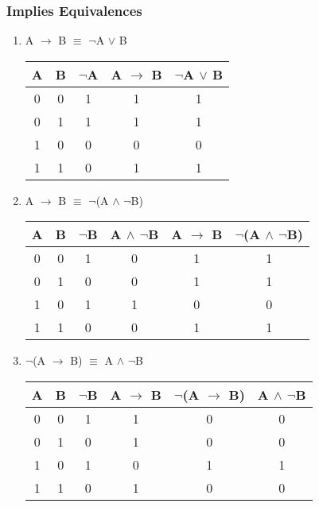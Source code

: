 \documentclass[11pt]{article}
\begin{document}
\subsubsection{Implies Equivalences}
\begin{enumerate}

  \item A $\to$ B $\equiv$ $\neg$A $\lor$ B

\begin{center}
  \begin{tabular}{| c | c | c | c | c |}
    \hline
    A & B & $\neg$A & A $\to$ B & $\neg$A $\lor$ B \\ \hline
    0 & 0 & 1 & 1 & 1 \\
    0 & 1 & 1 & 1 & 1 \\ 
    1 & 0 & 0 & 0 & 0 \\
    1 & 1 & 0 & 1 & 1 \\ \hline
  \end{tabular}
\end{center}

  \item A $\to$ B $\equiv$ $\neg$(A $\land$ $\neg$B)

\begin{center}
  \begin{tabular}{| c | c | c | c | c | c |}
    \hline
    A & B & $\neg$B & A $\land$ $\neg$B & A $\to$ B & $\neg$(A $\land$ $\neg$B) \\ \hline
    0 & 0 & 1 & 0 & 1 & 1 \\
    0 & 1 & 0 & 0 & 1 & 1 \\
    1 & 0 & 1 & 1 & 0 & 0 \\
    1 & 1 & 0 & 0 & 1 & 1 \\ \hline
  \end{tabular}
\end{center}

  \item $\neg$(A $\to$ B) $\equiv$ A $\land$ $\neg$B

\begin{center}
  \begin{tabular}{| c | c | c | c | c | c |}
    \hline
    A & B & $\neg$B & A $\to$ B & $\neg$(A $\to$ B) & A $\land$ $\neg$B \\ \hline
    0 & 0 & 1 & 1 & 0 & 0 \\
    0 & 1 & 0 & 1 & 0 & 0 \\
    1 & 0 & 1 & 0 & 1 & 1 \\
    1 & 1 & 0 & 1 & 0 & 0 \\ \hline
  \end{tabular}
\end{center}
\end{enumerate}
\end{document}
